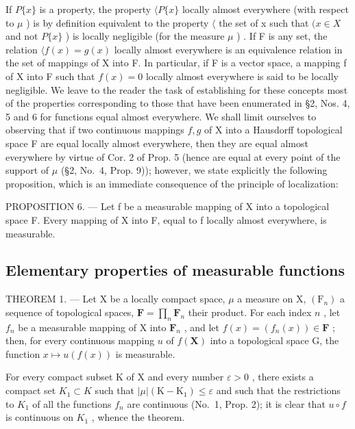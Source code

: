 If \(P\{x\}\) is a property, the property \(\langle P\{x\}\) locally almost everywhere (with respect to \(\mu\) ) is by definition equivalent to the property \(\langle\) the set of x such that \((x \in X\) and not \(P\{x\}\) ) is locally negligible (for the measure \(\mu\) ) . If F is any set, the relation \(\langle f(x) = g(x)\) locally almost everywhere is an equivalence relation in the set of mappings of X into F. In particular, if F is a vector space, a mapping f of X into F such that \(f(x) = 0\) locally almost everywhere is said to be locally negligible. We leave to the reader the task of establishing for these concepts most of the properties corresponding to those that have been enumerated in §2, Nos. 4, 5 and 6 for functions equal almost everywhere. We shall limit ourselves to observing that if two continuous mappings \(f, g\) of X into a Hausdorff topological space F are equal locally almost everywhere, then they are equal almost everywhere by virtue of Cor. 2 of Prop. 5 (hence are equal at every point of the support of \(\mu\) (§2, No.~4, Prop. 9)); however, we state explicitly the following proposition, which is an immediate consequence of the principle of localization:

PROPOSITION 6. --- Let f be a measurable mapping of X into a topological space F. Every mapping of X into F, equal to f locally almost everywhere, is measurable.

\subsection{Elementary properties of measurable functions}

THEOREM 1. --- Let X be a locally compact space, \(\mu\) a measure on X, \((\mathrm{F}_n)\) a sequence of topological spaces, \(\mathbf{F} = \prod_{n} \mathbf{F}_n\) their product. For each index \(n\) , let \(f_n\) be a measurable mapping of X into \(\mathbf{F}_n\) , and let \(f(x) = (f_n(x)) \in \mathbf{F}\) ; then, for every continuous mapping \(u\) of \(f(\mathbf{X})\) into a topological space G, the function \(x \mapsto u(f(x))\) is measurable.

For every compact subset K of X and every number \(\varepsilon > 0\) , there exists a compact set \(K_{1} \subset K\) such that \(|\mu|(\mathrm{K} - \mathrm{K}_{1}) \leqslant \varepsilon\) and such that the restrictions to \(K_{1}\) of all the functions \(f_{n}\) are continuous (No.~1, Prop. 2); it is clear that \(u \circ f\) is continuous on \(K_{1}\) , whence the theorem.

